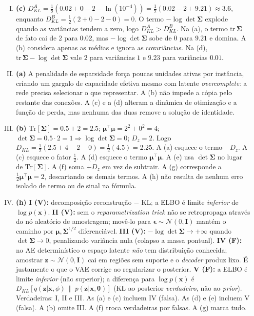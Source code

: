 \documentclass{dlproblemset}
\newcommand{\thetav}{\boldsymbol{\theta}}
\begin{document}
\begin{enumerate}[I)]
    \item \textbf{(c)} $D_{KL}^{A} = \tfrac{1}{2}\left(0.02 + 0 - 2 - \ln(10^{-4})\right) = \tfrac{1}{2}(0.02 - 2 + 9.21) \approx 3.6$, enquanto $D_{KL}^{B} = \tfrac{1}{2}(2 + 0 - 2 - 0) = 0$. O termo $-\log\det\boldsymbol{\Sigma}$ explode quando as variâncias tendem a zero, logo $D_{KL}^{A} > D_{KL}^{B}$. Na (a), o termo $\mathrm{tr}\,\boldsymbol{\Sigma}$ de fato cai de $2$ para $0.02$, mas $-\log\det\boldsymbol{\Sigma}$ sobe de $0$ para $9.21$ e domina. A (b) considera apenas as médias e ignora as covariâncias. Na (d), $\mathrm{tr}\,\boldsymbol{\Sigma} - \log\det\boldsymbol{\Sigma}$ vale $2$ para variâncias $1$ e $9.23$ para variâncias $0.01$.

    \item \textbf{(a)} A penalidade de esparsidade força poucas unidades ativas por instância, criando um gargalo de capacidade efetiva mesmo com latente \textit{overcomplete}: a rede precisa selecionar o que representar. A (b) não impede a cópia pelo restante das conexões. A (c) e a (d) alteram a dinâmica de otimização e a função de perda, mas nenhuma das duas remove a solução de identidade.

    \item \textbf{(b)} $\mathrm{Tr}[\boldsymbol{\Sigma}] = 0.5 + 2 = 2.5$; $\boldsymbol{\mu}^{\top}\boldsymbol{\mu} = 2^2 + 0^2 = 4$; $\det\boldsymbol{\Sigma} = 0.5\cdot 2 = 1 \Rightarrow \log\det\boldsymbol{\Sigma} = 0$; $D_z = 2$. Logo $D_{KL} = \tfrac{1}{2}(2.5 + 4 - 2 - 0) = \tfrac{1}{2}(4.5) = 2.25$. A (a) esquece o termo $-D_z$. A (c) esquece o fator $\tfrac{1}{2}$. A (d) esquece o termo $\boldsymbol{\mu}^{\top}\boldsymbol{\mu}$. A (e) usa $\det\boldsymbol{\Sigma}$ no lugar de $\mathrm{Tr}[\boldsymbol{\Sigma}]$. A (f) soma $+D_z$ em vez de subtrair. A (g) corresponde a $\tfrac{1}{2}\boldsymbol{\mu}^{\top}\boldsymbol{\mu} = 2$, descartando os demais termos. A (h) não resulta de nenhum erro isolado de termo ou de sinal na fórmula.

    \item \textbf{(h)} \textbf{I (V):} decomposição reconstrução $-$ KL; a ELBO é limite \emph{inferior} de $\log p(\mathbf{x})$. \textbf{II (V):} sem o \textit{reparametrization trick} não se retropropaga através do nó aleatório de amostragem; movê-lo para $\boldsymbol{\epsilon} \sim \mathcal{N}(0,\mathbf{I})$ mantém o caminho por $\boldsymbol{\mu}, \boldsymbol{\Sigma}^{1/2}$ diferenciável. \textbf{III (V):} $-\log\det\boldsymbol{\Sigma} \to +\infty$ quando $\det\boldsymbol{\Sigma} \to 0$, penalizando variância nula (colapso a massa pontual). \textbf{IV (F):} no AE determinístico o espaço latente \emph{não} tem distribuição conhecida; amostrar $\mathbf{z}\sim\mathcal{N}(0,\mathbf{I})$ cai em regiões sem suporte e o \textit{decoder} produz lixo. É justamente o que o VAE corrige ao regularizar o posterior. \textbf{V (F):} a ELBO é limite \emph{inferior} (não superior); a diferença para $\log p(\mathbf{x})$ é $D_{KL}[q(\mathbf{z}|\mathbf{x},\phi)\,\|\,p(\mathbf{z}|\mathbf{x},\thetav)]$ (KL ao posterior \emph{verdadeiro}, não ao \textit{prior}). Verdadeiras: I, II e III. As (a) e (c) incluem IV (falsa). As (d) e (e) incluem V (falsa). A (b) omite III. A (f) troca verdadeiras por falsas. A (g) marca tudo.
\end{enumerate}
\end{document}
